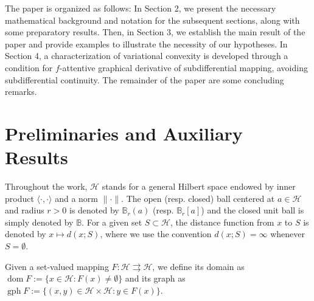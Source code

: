 \documentclass[smallextended,envcountsect,envcountsame]{svjour3}
\renewcommand{\H}{\mathcal{H}}
\newcommand{\tto}{\rightrightarrows}
\newcommand{\gph}{\operatorname{gph}}
\newcommand{\dom}{\operatorname{dom}}
\newcommand{\1}{\mathds{1}}
\begin{document}
    The paper is organized as follows: In Section 2, we present the necessary mathematical background and notation for the subsequent sections, along with some preparatory results. Then, in Section 3, we establish the main result of the paper and provide examples to illustrate the necessity of our hypotheses. In Section 4, a characterization of variational convexity is developed through a condition for $f$-attentive graphical derivative of subdifferential mapping, avoiding subdifferential continuity. The remainder of the paper are some concluding remarks.
    
    \section{Preliminaries and Auxiliary Results}
	Throughout the work, $\H$ stands for a general Hilbert space endowed by inner product $\langle \cdot, \cdot\rangle$ and a norm $\|\cdot\|$. The open (resp. closed) ball centered at $a\in\H$ and radius $r>0$ is denoted by $\mathbb{B}_r(a)$ (resp. $\mathbb{B}_r[a]$) and the closed unit ball is simply denoted by $\mathbb{B}$. For a given set $S\subset \H$, the distance function from $x$ to $S$ is denoted by $x\mapsto d(x;S)$, where we use the convention $d(x;S) = \infty$ whenever $S = \emptyset$.
	
	Given a set-valued mapping $F\colon \H\tto \H$, we define its domain as $\dom F := \{x\in\H : F(x)\neq\emptyset\}$ and its graph as $\gph F := \{(x,y)\in\H\times\H : y\in F(x)\}$.
	
\end{document}
